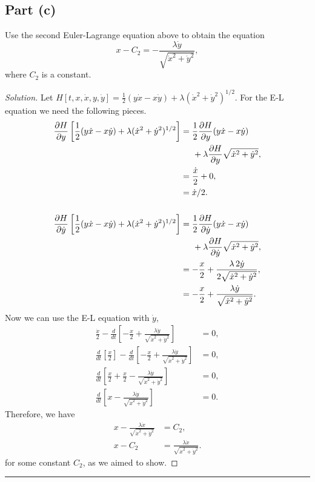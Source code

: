 \documentclass[letterpaper, 12pt]{amsart}
\theoremstyle{definition}  							%
\begin{document}
		\subsection*{Part (c)}
		Use the second Euler-Lagrange equation above to obtain the equation $$x - C_{2} = -\frac{\lambda\dot{y}}{\sqrt{\dot{x}^{2} + \dot{y}^{2}}},$$ where $C_{2}$ is a constant.

		\begin{proof}[Solution]
		Let $H[t, x, \dot{x}, y, \dot{y}] = \tfrac{1}{2}(y\dot{x} - x\dot{y})+\lambda(\dot{x}^{2} + \dot{y}^{2})^{1/2}$.
		For the E-L equation we need the following pieces.
			\begin{align*}
				\frac{\partial H}{\partial y}\left[ \frac{1}{2}(y\dot{x} - x\dot{y})+\lambda(\dot{x}^{2} + \dot{y}^{2})^{1/2} \right] &= \frac{1}{2} \frac{\partial H}{\partial y} (y\dot{x} - x\dot{y}) \\
				&\hspace{5mm} + \lambda \frac{\partial H}{\partial y}\sqrt{\dot{x}^{2} + \dot{y}^{2}}, \\
				&= \frac{\dot{x}}{2} + 0, \\
				&= \dot{x}/2. \\
				\\
				\frac{\partial H}{\partial \dot{y}}\left[ \frac{1}{2}(y\dot{x} - x\dot{y})+\lambda(\dot{x}^{2} + \dot{y}^{2})^{1/2} \right] &= \frac{1}{2} \frac{\partial H}{\partial \dot{y}} (y\dot{x} - x\dot{y}) \\
				&\hspace{5mm} + \lambda \frac{\partial H}{\partial \dot{y}}\sqrt{\dot{x}^{2} + \dot{y}^{2}}, \\
				&= -\frac{x}{2} + \frac{\lambda \, 2\dot{y}}{2 \sqrt{\dot{x}^{2} + \dot{y}^{2}}}, \\
				&= -\frac{x}{2} + \frac{\lambda \dot{y}}{\sqrt{\dot{x}^{2} + \dot{y}^{2}}}.
			\end{align*}
		Now we can use the E-L equation with $\dot{y}$,
			\begin{align*}
				\frac{\dot{x}}{2} - \frac{d}{dt}\left[ -\frac{x}{2} + \frac{\lambda \dot{y}}{\sqrt{\dot{x}^{2} + \dot{y}^{2}}} \right] &= 0, \\
				\frac{d}{dt}\left[ \frac{x}{2} \right] - \frac{d}{dt}\left[ -\frac{x}{2} + \frac{\lambda \dot{y}}{\sqrt{\dot{x}^{2} + \dot{y}^{2}}} \right] &= 0, \\
				\frac{d}{dt}\left[ \frac{x}{2} + \frac{x}{2} - \frac{\lambda \dot{y}}{\sqrt{\dot{x}^{2} + \dot{y}^{2}}} \right] &= 0, \\
				\frac{d}{dt}\left[ x - \frac{\lambda \dot{y}}{\sqrt{\dot{x}^{2} + \dot{y}^{2}}} \right] &= 0.
			\end{align*}
		Therefore, we have 
			\begin{align*}
				x - \frac{\lambda \dot{x}}{\sqrt{\dot{x}^{2} + \dot{y}^{2}}} &= C_{2}, \\
				x - C_{2} &= \frac{\lambda \dot{x}}{\sqrt{\dot{x}^{2} + \dot{y}^{2}}}.
			\end{align*}
		for some constant $C_{2}$, as we aimed to show.		
		\end{proof}
		\vspace*{2mm}
		\hrule
		\vspace*{2mm}
\end{document}

